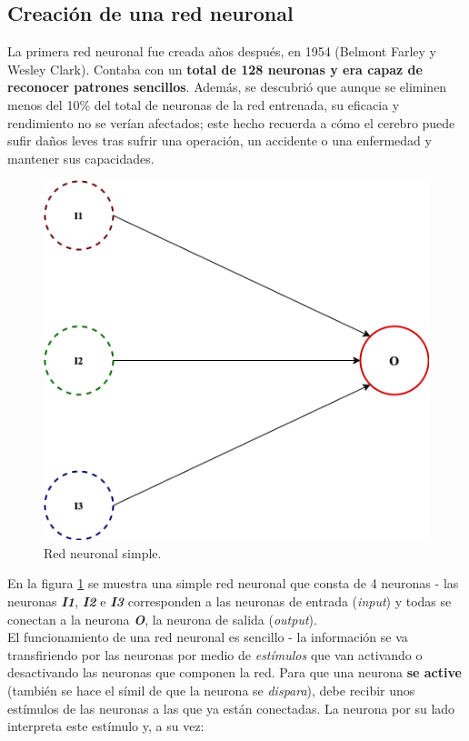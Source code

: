\subsection{Creación de una red neuronal}

La primera red neuronal fue creada años después, en 1954 (Belmont Farley y Wesley Clark). Contaba con un \textbf{total de 128 neuronas y era capaz de reconocer patrones sencillos}. Además, se descubrió que aunque se eliminen menos del 10\% del total de neuronas de la red entrenada, su eficacia y rendimiento no se verían afectados; este hecho recuerda a cómo el cerebro puede sufir daños leves tras sufrir una operación, un accidente o una enfermedad y mantener sus capacidades. \\

\begin{figure}[h]
    \centering
    \includegraphics[scale=0.35]{cap2_contextualizacion/images/red_neuronal.png}
    \caption{Red neuronal simple.}
    \label{fig:red_neuronal_simple}
\end{figure}

En la figura \ref{fig:red_neuronal_simple} se muestra una simple red neuronal que consta de 4 neuronas - las neuronas \textbf{\textit{I1}}, \textbf{\textit{I2}} e \textbf{\textit{I3}} corresponden a las neuronas de entrada (\textit{input}) y todas se conectan a la neurona \textbf{\textit{O}}, la neurona de salida (\textit{output}). \\

El funcionamiento de una red neuronal es sencillo - la información se va transfiriendo por las neuronas por medio de \textit{estímulos} que van activando o desactivando las neuronas que componen la red. Para que una neurona \textbf{se active} (también se hace el símil de que la neurona se \textit{dispara}), debe recibir unos estímulos de las neuronas a las que ya están conectadas. La neurona por su lado interpreta este estímulo y, a su vez:

